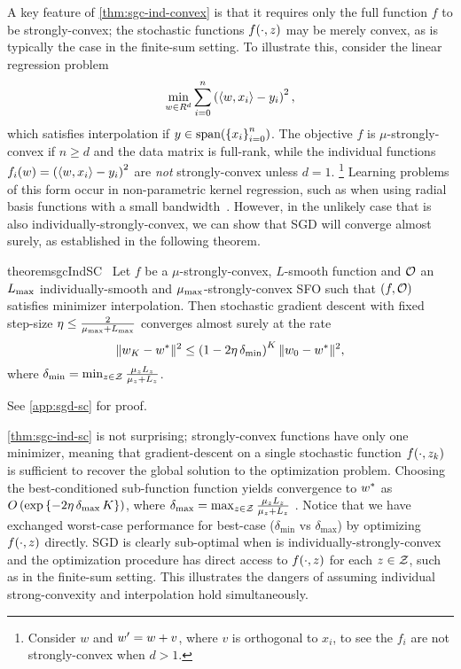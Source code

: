 A key feature of \autoref{thm:sgc-ind-convex} is that it requires only the full function \( f \) to be strongly-convex; the stochastic functions \( f(\cdot, \z) \) may be merely convex, as is typically the case in the finite-sum setting.
To illustrate this, consider the linear regression problem
\[ \min_{\w \in R^d} \sum_{i=0}^n \rbr{\abr{\w, x_i} - y_i}^2, \]
which satisfies interpolation if \( y \in \text{span}(\cbr{x_i}_{i=0}^n) \).
The objective \( f \) is \( \mu \)-strongly-convex if \( n \geq d \) and the data matrix is full-rank, while the individual functions \( f_i(\w) = \rbr{\abr{\w, x_i} - y_i}^2 \) are \emph{not} strongly-convex unless \( d = 1 \).%
\footnote{Consider \( w \) and \( \w' = \w + v \), where \( v \) is orthogonal to \( x_i \), to see the \( f_i \) are not strongly-convex when \( d > 1 \).}
Learning problems of this form occur in non-parametric kernel regression, such as when using radial basis functions with a small bandwidth~\citep{hastie2009elements}.
However, in the unlikely case that \oracle{} is also individually-strongly-convex, we can show that \ac{SGD} will converge almost surely, as established in the following theorem.

\begin{restatable}{theorem}{sgcIndSC}~\label{thm:sgc-ind-sc}
    Let \( f \) be a \( \mu \)-strongly-convex, \( L \)-smooth function and \( \oracle{} \) an \( \Lmax \) individually-smooth and \( \mumax \)-strongly-convex \ac{SFO} such that \( \rbr{f, \oracle{}} \) satisfies minimizer interpolation. 
    Then stochastic gradient descent with fixed step-size \( \eta \leq \frac{2}{\mumax + \Lmax} \) converges almost surely at the rate 
    \[ \norm{\w_{K} - \wopt}^2 \leq \rbr{1 - 2 \eta \, \delta_{\text{min}} }^K \norm{\w_0 - \wopt}^2, \] 
    where \( \delta_{\text{min}} = \min_{\z \in \calZ} \frac{\mu_\z L_\z}{\mu_\z + L_\z} \).
\end{restatable}%
\noindent See \autoref{app:sgd-sc} for proof.\hfill \break

\autoref{thm:sgc-ind-sc} is not surprising; strongly-convex functions have only one minimizer, meaning that gradient-descent on a single stochastic function \( f(\cdot, \zk) \) is sufficient to recover the global solution to the optimization problem.
Choosing the best-conditioned sub-function function yields convergence to \( \wopt \) as \( O\rbr{\exp\cbr{ - 2 \eta \, \delta_{\text{max}} \, K}} \), where \( \delta_{\text{max}} = \max_{\z \in \calZ} \frac{\mu_z L_\z}{\mu_z + L_\z} \) \citep{bubeck2015convex}.
Notice that we have exchanged worst-case performance for best-case (\( \delta_{\text{min}} \) vs \( \delta_{\text{max}} \)) by optimizing \( f(\cdot, \z) \) directly.
\ac{SGD} is clearly sub-optimal when \oracle{} is individually-strongly-convex and the optimization procedure has direct access to \( f(\cdot, \z ) \) for each \( \z \in \calZ \), such as in the finite-sum setting. 
This illustrates the dangers of assuming individual strong-convexity and interpolation hold simultaneously.

